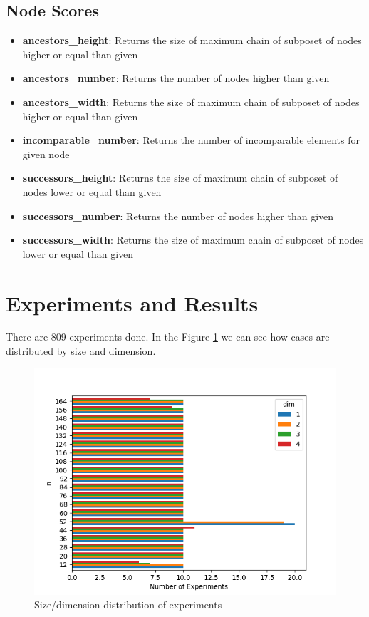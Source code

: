\documentclass{article}
\begin{document}
\subsection{Node Scores}
\begin{itemize}
\item \textbf{ancestors\_height}: Returns the size of maximum chain of subposet of nodes higher or equal than given
\item \textbf{ancestors\_number}: Returns the number of nodes higher than given
\item \textbf{ancestors\_width}: Returns the size of maximum chain of subposet of nodes higher or equal than given
\item \textbf{incomparable\_number}: Returns the number of incomparable elements for given node
\item \textbf{successors\_height}: Returns the size of maximum chain of subposet of nodes lower or equal than given
\item \textbf{successors\_number}: Returns the number of nodes higher than given
\item \textbf{successors\_width}: Returns the size of maximum chain of subposet of nodes lower or equal than given
\end{itemize}

\section{Experiments and Results}
\par There are 809 experiments done. In the Figure \ref{fig:cases_distribution} we can see how cases are distributed by size and dimension.
\begin{figure}[ht]
  \centering
  \includegraphics[width=\textwidth]{pics/scores - cases.png}
  \caption{Size/dimension distribution of experiments}
  \label{fig:cases_distribution}
\end{figure}
\end{document}
